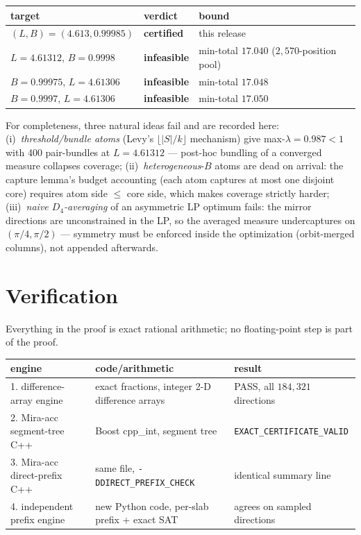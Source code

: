 \documentclass[11pt]{article}
\theoremstyle{definition}
\theoremstyle{remark}
\begin{document}
\begin{center}
\small
\begin{tabular}{@{}lll@{}}
\toprule
target & verdict & bound\\
\midrule
$(L,B)=(4.613,0.99985)$ & \textbf{certified} & this release\\
$L=4.61312$, $B=0.9998$ & \textbf{infeasible} & min-total $17.040$ ($2{,}570$-position pool)\\
$B=0.99975$, $L=4.61306$ & \textbf{infeasible} & min-total $17.048$\\
$B=0.9997$, $L=4.61306$ & \textbf{infeasible} & min-total $17.050$\\
\bottomrule
\end{tabular}
\end{center}

For completeness, three natural ideas fail and are recorded here:
(i)~\emph{threshold/bundle atoms} (Levy's $\lfloor |S|/k\rfloor$
mechanism) give max-$\lambda=0.987<1$ with 400 pair-bundles at
$L=4.61312$ --- post-hoc bundling of a converged measure collapses
coverage; (ii)~\emph{heterogeneous}-$B$ atoms are dead on arrival: the
capture lemma's budget accounting (each atom captures at most one
disjoint core) requires atom side $\le$ core side, which makes coverage
strictly harder; (iii)~\emph{naive $D_4$-averaging} of an asymmetric LP
optimum fails: the mirror directions are unconstrained in the LP, so the
averaged measure undercaptures on $(\pi/4,\pi/2)$ --- symmetry must be
enforced inside the optimization (orbit-merged columns), not appended
afterwards.

\section{Verification}\label{sec:verify}

Everything in the proof is exact rational arithmetic; no floating-point
step is part of the proof.

\begin{center}
\footnotesize
\begin{tabular}{@{}lll@{}}
\toprule
engine & code/arithmetic & result\\
\midrule
1. difference-array engine & exact fractions, integer 2-D difference arrays
 & PASS, all $184{,}321$ directions\\
2. Mira-acc segment-tree C++ & Boost cpp\_int, segment tree
 & \texttt{EXACT\_CERTIFICATE\_VALID}\\
3. Mira-acc direct-prefix C++ & same file, \texttt{-DDIRECT\_PREFIX\_CHECK}
 & identical summary line\\
4. independent prefix engine & new Python code, per-slab prefix + exact SAT
 & agrees on sampled directions\\
\bottomrule
\end{tabular}
\end{center}
\end{document}
